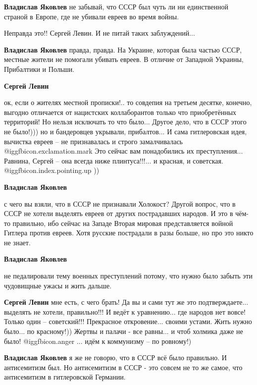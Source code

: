 \begin{itemize}
\begin{itemize}
\textbf{Владислав Яковлев} не забывай, что СССР был чуть ли ни единственной страной в Европе, где не убивали евреев во время войны.

Неправда это!! Сергей Левин. И не питай таких заблуждений...

\textbf{Владислав Яковлев} правда, правда. На Украине, которая была частью СССР, местные жители не помогали убивать евреев. В отличие от Западной Украины, Прибалтики и Польши.

\textbf{Сергей Левин} 

ок, если о жителях местной прописки!.. то совдепия на третьем десятке, конечно,
выгодно отличается от нацистских коллаборантов только что приобретённых
территорий! Но нельзя исключать то что было... Другое дело, что в СССР этого не
было!))) но и бандеровцев укрывали, прибалтов... И сама гитлеровская идея,
вычистка евреев – не признавалась и строго замалчивалась @igg{fbicon.exclamation.mark} Это сейчас вам
понадобились их преступления... Равнина, Сергей – она всегда ниже
плинтуса!!!... и красная, и советская. @igg{fbicon.index.pointing.up} ))

\textbf{Владислав Яковлев} 

с чего вы взяли, что в СССР не признавали Холокост? Другой вопрос, что в СССР
не хотели выделять евреев от других пострадавших народов. И это в чём-то
правильно, ибо сейчас на Западе Вторая мировая представляется войной Гитлера
против евреев. Хотя русские пострадали в разы больше, но про это никто не
знает.

\textbf{Владислав Яковлев} 

не педалировали тему военных преступлений потому, что нужно было забыть эти
чудовищные ужасы и жить дальше.

\textbf{Сергей Левин} мне есть, с чего брать! Да вы и сами тут же это подтверждаете... выделять не хотели, правильно!!! И ведёт к уравнению... где народов нет вовсе! Только один – советский!!! Прекрасное откровение... своими устами. Жить нужно было... по красному!)) Жертвы и палачи - все равны... и чтоб холмика даже не было! @igg{fbicon.anger} ... идём к коммунизму – по ровному!)

\textbf{Владислав Яковлев} я же не говорю, что в СССР всё было правильно. И антисемитизм был. Но антисемитизм в СССР - это совсем не то же самое, что антисемитизм в гитлеровской Германии.


\end{itemize}
\end{itemize}
